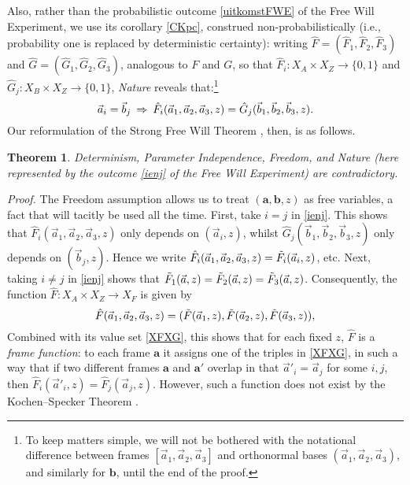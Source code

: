 \documentclass[12pt]{article}
\newtheorem{Theorem}[Definition]{Theorem}
\newcommand{\raw}{\rightarrow} \newcommand{\rat}{\mapsto}
\newcommand{\x}{\times} \newcommand{\hb}{\hbar}
\newcommand{\er}{\eqref}
\newcommand{\ba}{\mathbf{a}}\newcommand{\bb}{\mathbf{b}}
\begin{document}
Also, rather than the probabilistic outcome  \er{uitkomstFWE} of the Free Will Experiment, we use its corollary \er{CKpc}, construed non-probabilistically (i.e., probability one is replaced by deterministic certainty):  writing $\hat{F}=(\hat{F}_1,\hat{F}_2,\hat{F}_3)$ and  $\hat{G}=(\hat{G}_1,\hat{G}_2,\hat{G}_3)$, analogous to $F$ and $G$, so that $\hat{F}_i:X_A \x X_Z\raw \{0,1\}$ and $\hat{G}_j:X_B \x X_Z\raw \{0,1\}$, \emph{Nature} reveals that:\footnote{To keep matters simple, we will not be bothered with the notational difference between frames $[\vec{a}_1,\vec{a}_2,\vec{a}_3]$ and orthonormal bases $(\vec{a}_1,\vec{a}_2,\vec{a}_3)$, and similarly for $\bb$, until the end of the proof.}
 \begin{equation}
\vec{a}_i=\vec{b}_j\: \Rightarrow\: \hat{F}_i(\vec{a}_1,\vec{a}_2,\vec{a}_3,z)=\hat{G}_j(\vec{b}_1,\vec{b}_2,\vec{b}_3,z). \label{ienj}
\end{equation}
Our reformulation of the Strong Free Will Theorem \cite{BS,Clifton,CK2,HR,Stairs}, then, is as follows.
\begin{Theorem}\label{CKFWT}
Determinism, Parameter Independence, Freedom,  and Nature (here represented by the outcome \er{ienj} of the Free Will Experiment) are  contradictory.
\end{Theorem}
\emph{Proof.} 
The Freedom assumption allows us to treat $(\ba,\bb,z)$ as free variables, a fact that will tacitly be used all the time.
First, take $i=j$ in \er{ienj}. This shows that  $\hat{F}_i(\vec{a}_1,\vec{a}_2,\vec{a}_3,z)$ only depends on $(\vec{a}_i,z)$, whilst
$\hat{G}_j(\vec{b}_1,\vec{b}_2,\vec{b}_3,z)$ only depends on $(\vec{b}_j,z)$. Hence we write $\hat{F}_i(\vec{a}_1,\vec{a}_2,\vec{a}_3,z)=\tilde{F}_i(\vec{a}_i,z)$, etc. 
Next, taking 
 $i\neq j$ in \er{ienj} shows that $\tilde{F}_1(\vec{a},z)=\tilde{F}_2(\vec{a},z)=\tilde{F}_3(\vec{a},z)$.
Consequently, the function  $\hat{F}:X_A \x X_Z\raw X_F$ is given by
\begin{equation}
\hat{F}(\vec{a}_1,\vec{a}_2,\vec{a}_3,z)=(\tilde{F}(\vec{a}_1,z),\tilde{F}(\vec{a}_2,z),\tilde{F}(\vec{a}_3,z)),
\end{equation}
Combined with its value set \er{XFXG}, this
shows that for each fixed $z$, $\hat{F}$ is a \emph{frame function}: to each frame $\ba$ it assigns one of the triples in \er{XFXG}, in such a way that if two different frames $\ba$ and $\ba'$ overlap in that $\vec{a}'_i=\vec{a}_j$ for some $i,j$, then $\hat{F}_i(\vec{a}'_i,z)=\hat{F}_j(\vec{a}_j,z)$.
However, such a function does not exist by the Kochen--Specker Theorem \cite{KS,Peres}.\enp
\end{document}
